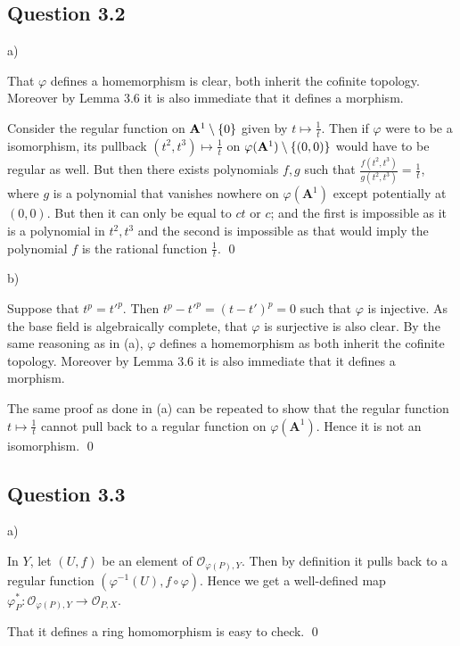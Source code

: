 \documentclass{article}
\begin{document}
\subsection*{Question 3.2}

\noindent a)

That $\varphi$ defines a homemorphism is clear, both inherit the cofinite topology. Moreover by Lemma 3.6 it is also immediate that it defines a morphism.

Consider the regular function on $\mathbf{A}^1 \setminus \{0\}$ given by $t \mapsto \frac{1}{t}$. Then if $\varphi$ were to be a isomorphism, its pullback $(t^2,t^3) \mapsto \frac{1}{t}$ on $\varphi(\mathbf{A}^1) \setminus \{(0,0)\}$ would have to be regular as well. But then there exists polynomials $f,g$ such that $\frac{f(t^2,t^3)}{g(t^2,t^3)} = \frac{1}{t}$, where $g$ is a polynomial that vanishes nowhere on $\varphi(\mathbf{A}^1)$ except potentially at $(0,0)$. But then it can only be equal to $ct$ or $c$; and the first is impossible as it is a polynomial in $t^2,t^3$ and the second is impossible as that would imply the polynomial $f$ is the rational function $\frac{1}{t}$. \qed

\noindent b)

Suppose that $t^p = t'^p$. Then $t^p - t'^p = (t-t')^p =0$ such that $\varphi$ is injective. As the base field is algebraically complete, that $\varphi$ is surjective is also clear. By the same reasoning as in (a), $\varphi$ defines a homemorphism as both inherit the cofinite topology. Moreover by Lemma 3.6 it is also immediate that it defines a morphism.

The same proof as done in (a) can be repeated to show that the regular function $t \mapsto \frac{1}{t}$ cannot pull back to a regular function on $\varphi(\mathbf{A}^1)$. Hence it is not an isomorphism. \qed
\lspace

\subsection*{Question 3.3}

\noindent a)

In $Y$, let $(U,f)$ be an element of $\mathcal{O}_{\varphi (P),Y}$. Then by definition it pulls back to a regular function $(\varphi^{-1}(U), f \circ \varphi)$. Hence we get a well-defined map $\varphi_P^*: \mathcal{O}_{\varphi(P),Y} \to \mathcal{O}_{P,X}$.

That it defines a ring homomorphism is easy to check. \qed
\end{document}
